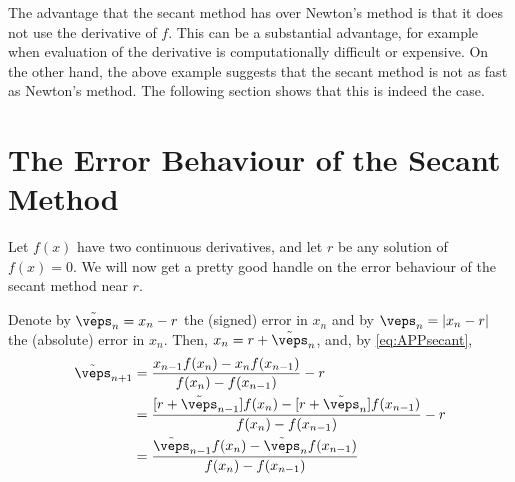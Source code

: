  
The advantage that the secant method has over Newton's method is that it does not use the derivative of $f$. This can be a substantial advantage, for example  
when  evaluation of the derivative is computationally difficult or expensive. 
On the other hand, the above example suggests that the secant method is not 
as fast as Newton's method. The following section shows that this is indeed the case.

\section{The Error Behaviour of the Secant Method}

Let $f(x)$ have two continuous derivatives, and let $r$ be any solution 
of $f(x)=0$. 
We will now get a pretty good handle on the error behaviour of the secant method 
near $r$.

Denote by $\tilde\veps_n=x_n-r$ the (signed) error in $x_n$ and by
$\veps_n=|x_n-r|$ the (absolute) error in $x_n$. Then, 
$x_n =r+\tilde\veps_n$, and, by \eqref{eq:APPsecant}, 
\begin{align*}
\tilde\veps_{n+1} 
         &= \frac{x_{n-1} f(x_n) - x_n f(x_{n-1}) }{f(x_n)-f(x_{n-1})} -r \\
         &= \frac{[r+\tilde\veps_{n-1}] f(x_n) - [r+\tilde\veps_n] f(x_{n-1}) }
                                            {f(x_n)-f(x_{n-1})} -r \\
         &= \frac{\tilde\veps_{n-1} f(x_n) - \tilde\veps_n f(x_{n-1}) }
                                            {f(x_n)-f(x_{n-1})}
\end{align*}


